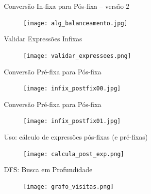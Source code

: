 \begin{frame}[c]{Conversão In-fixa para Pós-fixa -- versão 2} 
		   	\begin{figure}[!htpb]
				\centering
				\texttt{[image: alg\_balanceamento.jpg]}
			\end{figure} 
\end{frame}


\begin{frame}[c]{Validar Expressões Infixas} 

		   	\begin{figure}[!htpb]
				\centering
				\texttt{[image: validar\_expressoes.png]}
			\end{figure} 
\end{frame}


\begin{frame}[c]{Conversão Pré-fixa para Pós-fixa} 

		   	\begin{figure}[!htpb]
				\centering
				\texttt{[image: infix\_postfix00.jpg]}
			\end{figure} 

\end{frame}



\begin{frame}[c]{Conversão Pré-fixa para Pós-fixa} 

		   	\begin{figure}[!htpb]
				\centering
				\texttt{[image: infix\_postfix01.jpg]}
			\end{figure} 
\end{frame}




\begin{frame}[c]{Uso: cálculo de  expressões pós-fixas (e pré-fixas)} 

		   	\begin{figure}[!htpb]
				\centering
				\texttt{[image: calcula\_post\_exp.png]}
			\end{figure} 
\end{frame}


\begin{frame}[c]{DFS: Busca em Profundidade} 

		   	\begin{figure}[!htpb]
				\centering
				\texttt{[image: grafo\_visitas.png]}
			\end{figure} 
\end{frame}




